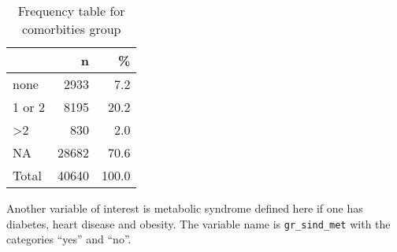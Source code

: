 \documentclass[
]{article}
\begin{document}
\begin{table}[!h]

\caption{\label{tab:unnamed-chunk-50}Frequency table for comorbities group}
\centering
\begin{tabular}[t]{l|r|r}
\hline
  & n & \%\\
\hline
none & 2933 & 7.2\\
\hline
1 or 2 & 8195 & 20.2\\
\hline
>2 & 830 & 2.0\\
\hline
NA & 28682 & 70.6\\
\hline
Total & 40640 & 100.0\\
\hline
\end{tabular}
\end{table}

Another variable of interest is metabolic syndrome defined here if one
has diabetes, heart disease and obesity. The variable name is
\texttt{gr\_sind\_met} with the categories ``yes'' and ``no''.
\end{document}
